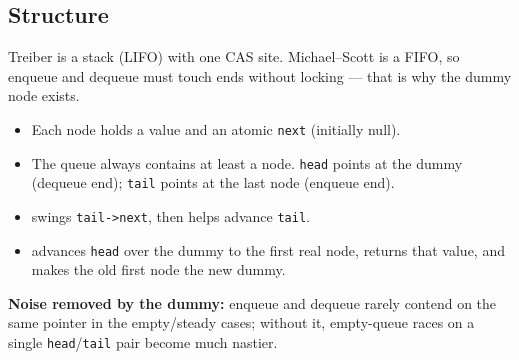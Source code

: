 \subsection{Structure}
\label{subsec:ms-structure}
Treiber is a stack (LIFO) with one CAS site. Michael--Scott is a FIFO, so enqueue and 
dequeue must touch  ends without locking --- that is why the 
dummy node exists.
\begin{itemize}
    \item Each node holds a value and an atomic \texttt{next} (initially null).
    \item The queue always contains at least a  node. 
          \texttt{head} points at the dummy (dequeue end); \texttt{tail} points at 
          the last node (enqueue end).
    \item {} swings \texttt{tail->next}, then helps advance 
          \texttt{tail}.
    \item {} advances \texttt{head} over the dummy to the first 
          real node, returns that value, and makes the old first node the new dummy.
\end{itemize}
\textbf{Noise removed by the dummy:} enqueue and dequeue rarely contend on the same 
pointer in the empty/steady cases; without it, empty-queue races on a single 
\texttt{head}/\texttt{tail} pair become much nastier.

